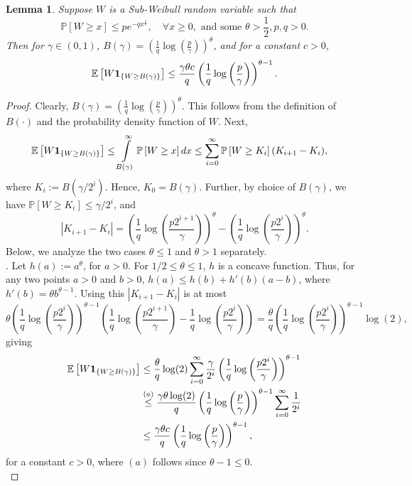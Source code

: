 \documentclass{article}
\newcommand{\lrp}[1]{\left( #1 \right)}
\newcommand{\lrs}[1]{\left[ #1 \right]}
\newcommand{\abs}[1]{\left|{#1}\right|}
\newcommand{\E}[1]{\mathbb{E}\lrs{#1}}
\newcommand{\Prob}[1]{\mathbb{P}\lrs{#1}}
\newtheorem{lemma}[theorem]{Lemma}
\begin{document}
\begin{lemma}\label{lem:subweibull}
    Suppose $W$ is a Sub-Weibull random variable such that 
    \[ \Prob{W \ge x} \le p e^{-qx^\frac{1}{\theta}}, \quad \forall x\ge 0, \text{ and  some }\theta > \frac{1}{2}, p, q> 0. \]
    Then for $\gamma \in (0,1)$,  $B(\gamma) = \lrp{ \tfrac{1}{q} \log\left(\tfrac{p}{\gamma}\right)}^\theta$, and for a constant $c > 0$, 
    \[  \E{ W{\bf 1}_{\{W \ge B(\gamma)\}} } \le \frac{\gamma \theta c}{q} \lrp{\frac{1}{q}\log\left(\frac{p}{\gamma}\right)}^{\theta - 1}. \]
\end{lemma}
\begin{proof}
Clearly, $B(\gamma) = \lrp{ \tfrac{1}{q}\log\left(\tfrac{p}{\gamma}\right) }^\theta$. This follows from the definition of $B(\cdot)$ and the probability density function of $W$. Next, 
\begin{align*}
    \E{ W{\bf 1}_{\{W \ge B(\gamma)\}} } &\le \int\limits_{B(\gamma)}^\infty \Prob{W \ge x} dx \le  \sum\limits_{i=0}^\infty \Prob{W \ge K_i} (K_{i+1}  - K_i),
\end{align*}    
where $K_i := B(\gamma/2^i)$. Hence, $K_0 = B(\gamma)$. Further, by choice of $B(\gamma)$, we have $\Prob{W \ge K_i} \le \gamma/2^i$, and 
\[\abs{K_{i+1} - K_i} = \lrp{\frac{1}{q}\log\left(\frac{p 2^{i+1}}{\gamma}\right)}^\theta - \lrp{\frac{1}{q}\log\left(\frac{p 2^{i}}{\gamma}\right)}^\theta.\]
Below, we analyze the two cases $\theta \le 1$ and $\theta > 1$ separately.\\

\noindent{Case 1: $\theta \in (1/2,1]$}. Let $h(a) := a^\theta$, for $a > 0$. For $1/2 \le \theta \le 1$, $h$ is a concave function. Thus, for any two points $a > 0$ and $b > 0$, $ h(a) \le h(b) + h'(b)(a-b)$, where $h'(b) = \theta b^{\theta - 1}$. Using this $\abs{K_{i+1} - K_i}$ is at most 
    \[  \theta\lrp{\frac{1}{q}\log\left(\frac{p 2^{i}}{\gamma}\right)}^{\theta - 1}\lrp{ \frac{1}{q}\log\left(\frac{p 2^{i+1}}{\gamma}\right) - \frac{1}{q}\log\left(\frac{p 2^{i}}{\gamma}\right) } = \frac{\theta}{q}\lrp{\frac{1}{q}\log\left(\frac{p 2^{i}}{\gamma}\right)}^{\theta - 1}\log(2),\]
    giving 
    \begin{align*} 
        \E{ W{\bf 1}_{\{W \ge B(\gamma)\}} } &\le \frac{\theta}{q} \log(2) \sum\limits_{i=0}^\infty \frac{\gamma}{2^i}\lrp{\frac{1}{q}\log\left(\frac{p 2^{i}}{\gamma}\right)}^{\theta - 1} \\
        &\overset{(a)}{\le} \frac{\gamma \theta \log(2)}{q} \lrp{\frac{1}{q}\log\left(\frac{p}{\gamma}\right)}^{\theta - 1}\sum\limits_{i=0}^\infty \frac{1}{2^i}\\
        &\le \frac{\gamma \theta c}{q} \lrp{\frac{1}{q}\log\left(\frac{p}{\gamma}\right)}^{\theta - 1}, 
    \end{align*}
    for a constant $c > 0$, where $(a)$ follows since $\theta - 1 \le 0$.\\


\end{proof}
\end{document}
